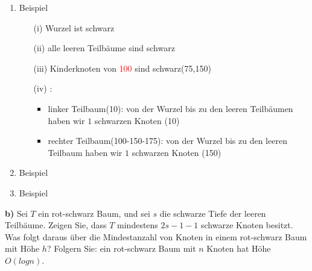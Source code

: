 \begin{multicols}{2}

\begin{enumerate}

\item Beispiel




\begin{itemize}
	\item[(i)] Wurzel ist schwarz
	\item[(ii)] alle leeren Teilbäume sind schwarz
	\item[(iii)] Kinderknoten von \textcolor{red}{100} sind schwarz(75,150)
	\item[(iv)]:
	\begin{itemize}
		\item linker Teilbaum(10): von der Wurzel bis zu den leeren Teilbäumen haben wir $1$ schwarzen Knoten (10)
		\item rechter Teilbaum(100-150-175): von der Wurzel bis zu den leeren Teilbaum haben wir $1$ schwarzen Knoten (150)
	\end{itemize}
\end{itemize}

\item Beispiel

\item Beispiel

\end{enumerate}

\end{multicols}

\noindent
\textbf{b)} Sei $T$ ein rot-schwarz Baum, und sei $s$ die schwarze Tiefe der leeren Teilbäume. Zeigen Sie, dass $T$ mindestens $2s-1 - 1$ schwarze Knoten besitzt. Was folgt daraus über die Mindestanzahl von Knoten in einem rot-schwarz Baum mit Höhe $h$? Folgern Sie: ein rot-schwarz Baum mit $n$ Knoten hat Höhe $O(log n)$.\\